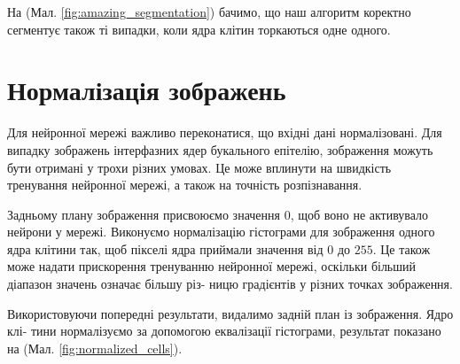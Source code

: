 \bigskip
На (Мал. \ref{fig:amazing_segmentation}) бачимо, що наш алгоритм коректно сегментує також ті випадки, коли ядра клітин торкаються одне одного.



\section{Нормалізація зображень}

Для нейронної мережі важливо переконатися, що вхідні дані нормалізовані. Для випадку зображень інтерфазних ядер букального епітелію, зображення можуть бути отримані у трохи різних умовах. Це може вплинути на швидкість тренування нейронної мережі, а також на точність розпізнавання.

Задньому плану зображення присвоюємо значення \(0\), щоб воно не активувало нейрони у мережі. Виконуємо нормалізацію гістограми для зображення одного ядра клітини так, щоб пікселі ядра приймали значення від \(0\) до \(255\). Це також може надати прискорення тренуванню нейронної мережі, оскільки більший діапазон значень означає більшу різ- ницю градієнтів у різних точках зображення.

Використовуючи попередні результати, видалимо задній план із зображення. Ядро клі- тини нормалізуємо за допомогою еквалізації гістограми, результат показано на  (Мал. \ref{fig:normalized_cells}).


